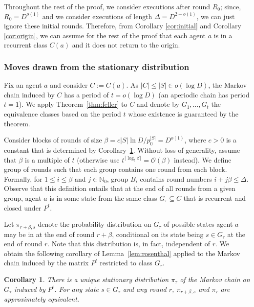 \documentclass[11pt]{article}
\newtheorem{corollary}[theorem]{Corollary}
\newcommand{\N}{\mathbb{N}}
\newcommand{\BO}{\mathcal{O}}
\begin{document}
Throughout the rest of the proof, we consider executions after round $R_0$; since, $R_0 = D^{o(1)}$ and we consider executions of length $\Delta = D^{2-o(1)}$, we can just ignore these initial rounds. Therefore, from Corollary \ref{cor:initial} and Corollary \ref{cor:origin}, we can assume for the rest of the proof that each agent $a$ is in a recurrent class $C(a)$ and it does not return to the origin.


\subsubsection{Moves drawn from the stationary distribution}
\label{sec:draw}

Fix an agent $a$ and consider $C:=C(a)$. As $|C|\leq |S|\in o(\log D)$, the Markov chain induced by $C$ has a period of $t = o(\log D)$ (an aperiodic chain has period $t=1$). We apply Theorem~\ref{thm:feller} to $C$ and denote by $G_1,\ldots,G_t$ the equivalence classes based on the period $t$ whose existence is guaranteed by the theorem.

Consider blocks of rounds of size $\beta = c |S| \ln D / p_0^{|S|}=D^{o(1)}$, where $c>0$ is a constant that is determined by Corollary~\ref{cor:bound}. Without loss of generality, assume that $\beta$ is a multiple of $t$ (otherwise use $t^{\lceil\log_t \beta\rceil}=\BO(\beta)$ instead). We define group of rounds such that each group contains one round from each block. Formally, for $1 \leq i \leq \beta$ and $j \in \N_0$, group $B_i$ contains round numbers $i + j\beta \leq \Delta$. Observe that this definition entails that at the end of all rounds from a given group, agent $a$ is in some state from the same class $G_{\tau}\subseteq C$ that is recurrent and closed under $P^t$.

Let $\pi_{r+\beta,s}$ denote the probability distribution on $G_{\tau}$ of possible states agent $a$ may be in at the end of round $r+\beta$, conditional on its state being $s\in G_{\tau}$ at the end of round $r$. Note that this distribution is, in fact, independent of $r$. We obtain the following corollary of Lemma~\ref{lem:rosenthal} applied to the Markov chain induced by the matrix $P^t$ restricted to class $G_{\tau}$.

\begin{corollary}
\label{cor:bound}
	There is a unique stationary distribution $\pi_{\tau}$ of the Markov chain on $G_{\tau}$ induced by $P^t$. For any state $s \in G_{\tau}$ and any round $r$, $\pi_{r+\beta,s}$ and $\pi_{\tau}$ are approximately equivalent.
\end{corollary}
\end{document}
